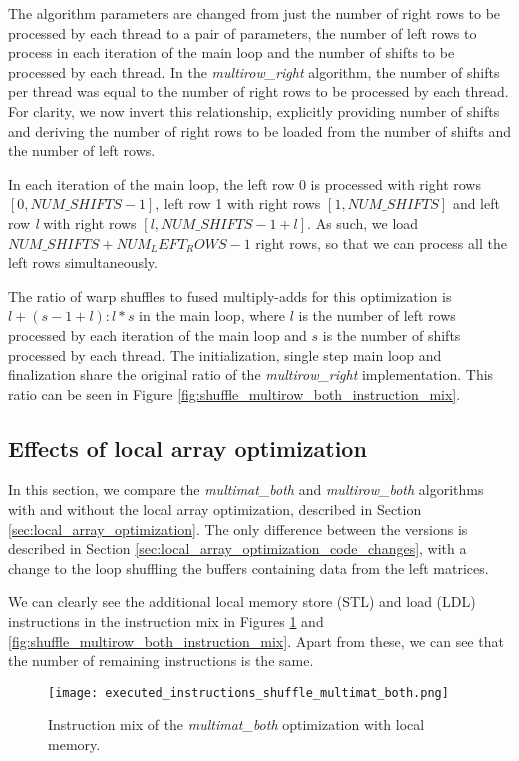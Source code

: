 The algorithm parameters are changed from just the number of right rows to be processed by each thread to a pair of parameters, the number of left rows to process in each iteration of the main loop and the number of shifts to be processed by each thread. In the \textit{multirow\_right} algorithm, the number of shifts per thread was equal to the number of right rows to be processed by each thread. For clarity, we now invert this relationship, explicitly providing number of shifts and deriving the number of right rows to be loaded from the number of shifts and the number of left rows. 

In each iteration of the main loop, the left row 0 is processed with right rows $[0, NUM\_SHIFTS - 1]$, left row 1 with right rows $[1, NUM\_SHIFTS]$ and left row \textit{l} with right rows $[l, NUM\_SHIFTS - 1 + l]$. As such, we load $NUM\_SHIFTS + NUM_LEFT_ROWS - 1$ right rows, so that we can process all the left rows simultaneously. 

The ratio of warp shuffles to fused multiply-adds for this optimization is $l + (s - 1 + l) : l * s$ in the main loop, where $l$ is the number of left rows processed by each iteration of the main loop and $s$ is the number of shifts processed by each thread.  
The initialization, single step main loop and finalization share the original ratio of the \textit{multirow\_right} implementation. This ratio can be seen in Figure \ref{fig:shuffle_multirow_both_instruction_mix}.


\subsection{Effects of local array optimization}

In this section, we compare the \textit{multimat\_both} and \textit{multirow\_both} algorithms with and without the local array optimization, described in Section \ref{sec:local_array_optimization}. The only difference between the versions is described in Section \ref{sec:local_array_optimization_code_changes}, with a change to the loop shuffling the buffers containing data from the left matrices.

We can clearly see the additional local memory store (STL) and load (LDL) instructions in the instruction mix in Figures \ref{fig:shuffle_multimat_both_instruction_mix} and \ref{fig:shuffle_multirow_both_instruction_mix}. Apart from these, we can see that the number of remaining instructions is the same.

\begin{figure}[ht]
	\centering
	\texttt{[image: executed\_instructions\_shuffle\_multimat\_both.png]}
	\caption{Instruction mix of the \textit{multimat\_both} optimization with local memory.}
	\label{fig:shuffle_multimat_both_instruction_mix}
\end{figure}


